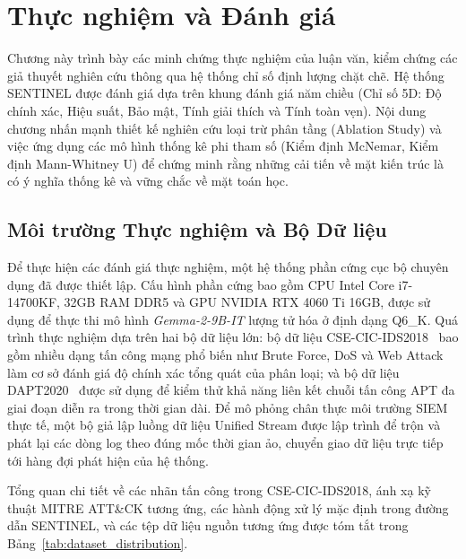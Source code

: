 \chapter{Thực nghiệm và Đánh giá}
\label{ch:experiments_evaluation}

Chương này trình bày các minh chứng thực nghiệm của luận văn, kiểm chứng các giả thuyết nghiên cứu thông qua hệ thống chỉ số định lượng chặt chẽ. Hệ thống SENTINEL được đánh giá dựa trên khung đánh giá năm chiều (Chỉ số 5D: Độ chính xác, Hiệu suất, Bảo mật, Tính giải thích và Tính toàn vẹn). Nội dung chương nhấn mạnh thiết kế nghiên cứu loại trừ phân tầng (Ablation Study) và việc ứng dụng các mô hình thống kê phi tham số (Kiểm định McNemar, Kiểm định Mann-Whitney U) để chứng minh rằng những cải tiến về mặt kiến trúc là có ý nghĩa thống kê và vững chắc về mặt toán học.

\section{Môi trường Thực nghiệm và Bộ Dữ liệu}
Để thực hiện các đánh giá thực nghiệm, một hệ thống phần cứng cục bộ chuyên dụng đã được thiết lập. Cấu hình phần cứng bao gồm CPU Intel Core i7-14700KF, 32GB RAM DDR5 và GPU NVIDIA RTX 4060 Ti 16GB, được sử dụng để thực thi mô hình \textit{Gemma-2-9B-IT} lượng tử hóa ở định dạng Q6\_K. Quá trình thực nghiệm dựa trên hai bộ dữ liệu lớn: bộ dữ liệu CSE-CIC-IDS2018~\cite{ids2018} bao gồm nhiều dạng tấn công mạng phổ biến như Brute Force, DoS và Web Attack làm cơ sở đánh giá độ chính xác tổng quát của phân loại; và bộ dữ liệu DAPT2020~\cite{dapt2020} được sử dụng để kiểm thử khả năng liên kết chuỗi tấn công APT đa giai đoạn diễn ra trong thời gian dài. Để mô phỏng chân thực môi trường SIEM thực tế, một bộ giả lập luồng dữ liệu Unified Stream được lập trình để trộn và phát lại các dòng log theo đúng mốc thời gian ảo, chuyển giao dữ liệu trực tiếp tới hàng đợi phát hiện của hệ thống.

Tổng quan chi tiết về các nhãn tấn công trong CSE-CIC-IDS2018, ánh xạ kỹ thuật MITRE ATT\&CK tương ứng, các hành động xử lý mặc định trong đường dẫn SENTINEL, và các tệp dữ liệu nguồn tương ứng được tóm tắt trong Bảng~\ref{tab:dataset_distribution}.

